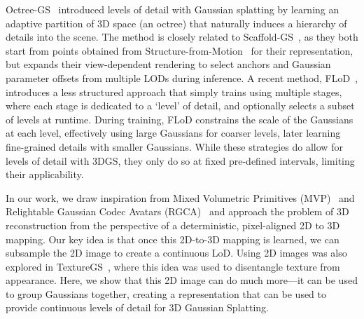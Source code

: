     Octree-GS~\cite{ren2024octree} introduced levels of detail with Gaussian
    splatting by learning an adaptive partition of 3D space (an octree) that
    naturally induces a hierarchy of details into the scene.
    The method is closely related to Scaffold-GS~\cite{lu2024scaffold}, as
    they both start from points obtained from
    Structure-from-Motion~\cite{schonberger2016structure} for their
    representation, but expands their view-dependent rendering to select
    anchors and Gaussian parameter offsets from multiple LODs during
    inference.
    A recent method, FLoD~\cite{seo2024flod}, introduces a less structured
    approach that simply trains using multiple stages, where each stage is
    dedicated to a `level' of detail, and optionally selects a subset of
    levels at runtime.
    During training, FLoD constrains the scale of the Gaussians at each level,
    effectively using large Gaussians for coarser levels, later learning
    fine-grained details with smaller Gaussians.
    While these strategies do allow for levels of detail with 3DGS, they only
    do so at fixed pre-defined intervals, limiting their applicability.

    In our work, we draw inspiration from Mixed Volumetric Primitives
    (MVP)~\cite{raj2021pixel,lombardi2021mixture} and Relightable Gaussian
    Codec Avatars (RGCA)~\cite{saito2024relightable} and approach the problem
    of 3D reconstruction from the perspective of a deterministic,
    pixel-aligned 2D to 3D mapping.
    Our key idea is that once this 2D-to-3D mapping is learned, we can
    subsample the 2D image to create a continuous LoD.
    Using 2D images was also explored in TextureGS~\cite{xu2024texturegs},
    where this idea was used to disentangle texture from appearance.
    Here, we show that this 2D image can do much more---it can be used to
    group Gaussians together, creating a representation that can be used to
    provide continuous levels of detail for 3D Gaussian Splatting.

